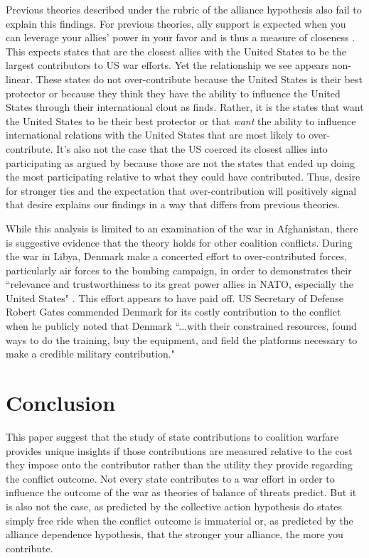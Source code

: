 \documentclass[12pt,letterpaper]{article}
\begin{document}
	Previous theories described under the rubric of the alliance hypothesis also fail to explain this findings. For previous theories, ally support is expected when you can leverage your allies' power in your favor and is thus a measure of closeness \citep{davidson_neoclassicalrealistexplanation_2011}. This expects states that are the closest allies with the United States to be the largest contributors to US war efforts. Yet the relationship we see appears non-linear. These states do not over-contribute because the United States is their best protector or because they think they have the ability to influence the United States through their international clout as \citet{ringsmose_natoburdensharingredux_2010} finds. Rather, it is the states that want the United States to be their best protector or that \textit{want} the ability to influence international relations with the United States that are most likely to over-contribute. It's also not the case that the US coerced its closest allies into participating as argued by \citet{kupchan_natopersiangulf_1988} because those are not the states that ended up doing the most participating relative to what they could have contributed. Thus, desire for stronger ties and the expectation that over-contribution will positively signal that desire explains our findings in a way that differs from previous theories.

	While this analysis is limited to an examination of the war in Afghanistan, there is suggestive evidence that the theory holds for other coalition conflicts. During the war in Libya, Denmark make a concerted effort to over-contributed forces, particularly air forces to the bombing campaign, in order to demonstrates their ``relevance and trustworthiness to its great power allies in NATO, especially the United States" \citep{jakobsen_prestigeseekingsmallstates_2018, dicke_natoburdensharinglibya_2013}. This effort appears to have paid off. US Secretary of Defense Robert Gates commended Denmark for its costly contribution to the conflict when he publicly noted that Denmark ``...with their constrained resources, found ways to do the training, buy the equipment, and field the platforms necessary to make a credible military contribution."

\section{Conclusion}
	This paper suggest that the study of state contributions to coalition warfare provides unique insights if those contributions are measured relative to the cost they impose onto the contributor rather than the utility they provide regarding the conflict outcome. Not every state contributes to a war effort in order to influence the outcome of the war as theories of balance of threats predict. But it is also not the case, as predicted by the collective action hypothesis do states simply free ride when the conflict outcome is immaterial or, as predicted by the alliance dependence hypothesis, that the stronger your alliance, the more you contribute.
\end{document}
